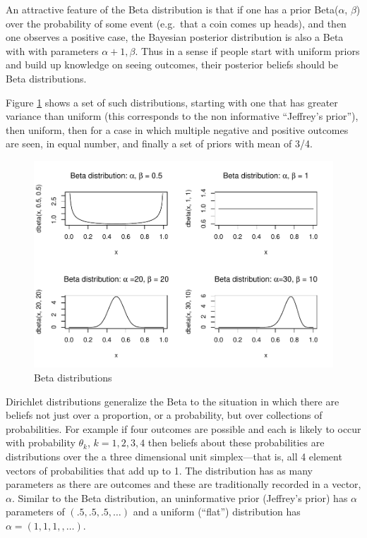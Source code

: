 \documentclass[12pt,]{book}
\begin{document}
An attractive feature of the Beta distribution is that if one has a prior Beta(\(\alpha\), \(\beta\)) over the probability of some event (e.g.~that a coin comes up heads), and then one observes a positive case, the Bayesian posterior distribution is also a Beta with with parameters \(\alpha+1, \beta\). Thus in a sense if people start with uniform priors and build up knowledge on seeing outcomes, their posterior beliefs should be Beta distributions.

Figure \ref{fig:Betas} shows a set of such distributions, starting with one that has greater variance than uniform (this corresponds to the non informative ``Jeffrey's prior''), then uniform, then for a case in which multiple negative and positive outcomes are seen, in equal number, and finally a set of priors with mean of 3/4.

\begin{figure}
\centering
\includegraphics{ii_files/figure-latex/Betas-1.pdf}
\caption{\label{fig:Betas}Beta distributions}
\end{figure}

Dirichlet distributions generalize the Beta to the situation in which there are beliefs not just over a proportion, or a probability, but over collections of probabilities. For example if four outcomes are possible and each is likely to occur with probability \(\theta_k\), \(k=1,2,3,4\) then beliefs about these probabilities are distributions over the a three dimensional unit simplex---that is, all 4 element vectors of probabilities that add up to 1. The distribution has as many parameters as there are outcomes and these are traditionally recorded in a vector, \(\alpha\). Similar to the Beta distribution, an uninformative prior (Jeffrey's prior) has \(\alpha\) parameters of \((.5,.5,.5, \dots)\) and a uniform (``flat'') distribution has \(\alpha = (1,1,1,,\dots)\).
\end{document}

